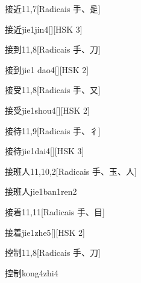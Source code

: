 \begin{entry}{接近}{11,7}[Radicais ⼿、⾡]
  \begin{phonetics}{接近}{jie1jin4}[][HSK 3]
  \end{phonetics}
\end{entry}

\begin{entry}{接到}{11,8}[Radicais ⼿、⼑]
  \begin{phonetics}{接到}{jie1 dao4}[][HSK 2]
  \end{phonetics}
\end{entry}

\begin{entry}{接受}{11,8}[Radicais ⼿、⼜]
  \begin{phonetics}{接受}{jie1shou4}[][HSK 2]
  \end{phonetics}
\end{entry}

\begin{entry}{接待}{11,9}[Radicais ⼿、⼻]
  \begin{phonetics}{接待}{jie1dai4}[][HSK 3]
  \end{phonetics}
\end{entry}

\begin{entry}{接班人}{11,10,2}[Radicais ⼿、⽟、⼈]
  \begin{phonetics}{接班人}{jie1ban1ren2}
  \end{phonetics}
\end{entry}

\begin{entry}{接着}{11,11}[Radicais ⼿、⽬]
  \begin{phonetics}{接着}{jie1zhe5}[][HSK 2]
  \end{phonetics}
\end{entry}

\begin{entry}{控制}{11,8}[Radicais ⼿、⼑]
  \begin{phonetics}{控制}{kong4zhi4}
  \end{phonetics}
\end{entry}

